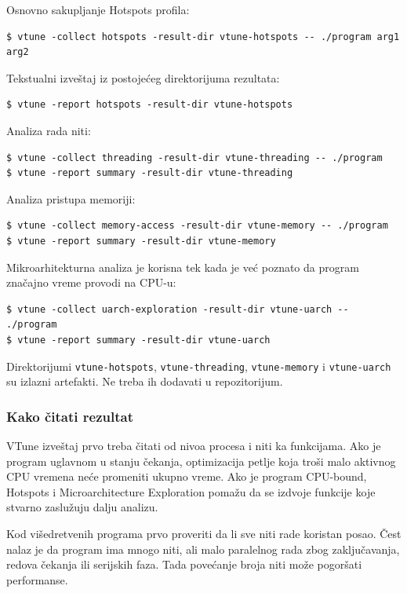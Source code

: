 Osnovno sakupljanje Hotspots profila:

\begin{verbatim}
$ vtune -collect hotspots -result-dir vtune-hotspots -- ./program arg1 arg2
\end{verbatim}

Tekstualni izveštaj iz postojećeg direktorijuma rezultata:

\begin{verbatim}
$ vtune -report hotspots -result-dir vtune-hotspots
\end{verbatim}

Analiza rada niti:

\begin{verbatim}
$ vtune -collect threading -result-dir vtune-threading -- ./program
$ vtune -report summary -result-dir vtune-threading
\end{verbatim}

Analiza pristupa memoriji:

\begin{verbatim}
$ vtune -collect memory-access -result-dir vtune-memory -- ./program
$ vtune -report summary -result-dir vtune-memory
\end{verbatim}

Mikroarhitekturna analiza je korisna tek kada je već poznato da program značajno vreme provodi na CPU-u:

\begin{verbatim}
$ vtune -collect uarch-exploration -result-dir vtune-uarch -- ./program
$ vtune -report summary -result-dir vtune-uarch
\end{verbatim}

Direktorijumi \texttt{vtune-hotspots}, \texttt{vtune-threading}, \texttt{vtune-memory} i \texttt{vtune-uarch} su izlazni artefakti. Ne treba ih dodavati u repozitorijum.

\subsubsection{Kako čitati rezultat}\label{vtune-citanje-rezultata}

VTune izveštaj prvo treba čitati od nivoa procesa i niti ka funkcijama. Ako je program uglavnom u stanju čekanja, optimizacija petlje koja troši malo aktivnog CPU vremena neće promeniti ukupno vreme. Ako je program CPU-bound, Hotspots i Microarchitecture Exploration pomažu da se izdvoje funkcije koje stvarno zaslužuju dalju analizu.

Kod višedretvenih programa prvo proveriti da li sve niti rade koristan posao. Čest nalaz je da program ima mnogo niti, ali malo paralelnog rada zbog zaključavanja, redova čekanja ili serijskih faza. Tada povećanje broja niti može pogoršati performanse.

